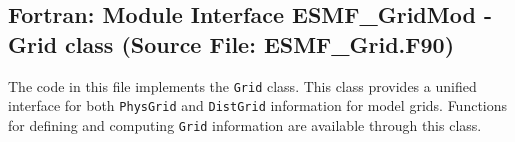  
\parskip        0pt
\parindent      0pt
\baselineskip  11pt
 
\def\bv{\begin{verbatim}}
\def\ev{\end{verbatim}}
\def\be{\begin{equation}}
\def\ee{\end{equation}}
\def\bea{\begin{eqnarray}}
\def\eea{\end{eqnarray}}
\def\bi{\begin{itemize}}
\def\ei{\end{itemize}}
\def\bn{\begin{enumerate}}
\def\en{\end{enumerate}}
\def\bd{\begin{description}}
\def\ed{\end{description}}
\def\({\left (}
\def\){\right )}
\def\[{\left [}
\def\]{\right ]}
\def\<{\left  \langle}
\def\>{\right \rangle}
\def\cI{{\cal I}}
\def\diag{\mathop{\rm diag}}
\def\tr{\mathop{\rm tr}}


 
\subsection{Fortran:  Module Interface ESMF\_GridMod - Grid class (Source File: ESMF\_Grid.F90)}


  
  
   The code in this file implements the {\tt Grid} class.  This class
   provides a unified interface for both {\tt PhysGrid} and {\tt DistGrid}
   information for model grids.  Functions for defining and computing {\tt Grid}
   information are available through this class.
  

